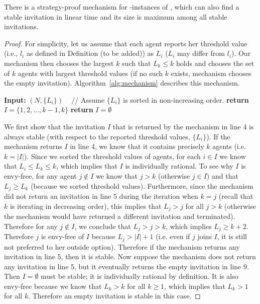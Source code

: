 \begin{theorem} \label{GT:thm:mechanism}
	There is a strategy-proof mechanism for \INC-instances of \AOIP, which can also find a stable invitation in linear time and its size is maximum among all stable invitations.
\end{theorem} 
\begin{proof}
For simplicity, let us assume that each agent reports her threshold value (i.e., $l_i$ as defined in Definition (to be added)) as $L_i$ ($L_i$ may differ from $l_i$). Our mechanism then chooses the largest $k$ such that $L_k \leq k$ holds and chooses the set of $k$ agents with largest threshold values (if no such $k$ exists, mechanism chooses the empty invitation). Algorithm~\ref{alg:mechanism} describes this mechanism.
\begin{algorithm}
	\caption{Strategy-proof Mechanism}
	\label{alg:mechanism}
\begin{algorithmic}[1]
	\State \textbf{Input:} $(N, \{L_i\})$ ~ // Assume $\{L_i\}$ is sorted in non-increasing order.
			\State \textbf{return} $I = \{1, 2, \dots, {k-1}, {k}\}$
		\EndIf
	\EndFor
	\State \textbf{return} $I = \emptyset$
\end{algorithmic}
\end{algorithm} 
	
We first show that the invitation $I$ that is returned by the mechanism in line 4 is always stable (with respect to the reported threshold values, $\{L_i\}$). If the mechanism returns $I$ in line 4, we know that it contains precisely $k$ agents (i.e. $k = |I|$). Since we sorted the threshold values of agents, for each $i \in I$ we know that $L_i \leq L_k \leq k$, which implies that $I$ is individually rational. To see why $I$ is envy-free, for any agent $j\not\in I$ we know that $j > k$ (otherwise $j\in I$) and that $L_j \geq L_k$ (because we sorted threshold values). Furthermore, since the mechanism did not return an invitation in line 5 during the iteration when $k = j$ (recall that $k$ is iterating in decreasing order), this implies that $L_j > j$ for all $j > k$ (otherwise the mechanism would have returned a different invitation and terminated). Therefore for any $j\not\in I$, we conclude that $L_j > j > k$, which implies $L_j \geq k+2$. Therefore $j$ is envy-free of $I$ because $L_j > |I| + 1$ (i.e. even if $j$ joins $I$, it is still not preferred to her outside option). Therefore if the mechanism returns any invitation in line 5, then it is stable. Now suppose the mechanism does not return any invitation in line 5, but it eventually returns the empty invitation in line 9. Then $I = \emptyset$ must be stable; it is individually rational by definition. It is also envy-free because we know that $L_k > k$ for all $k \geq 1$, which implies that $L_k > 1$ for all $k$. Therefore an empty invitation is stable in this case.


\end{proof}
